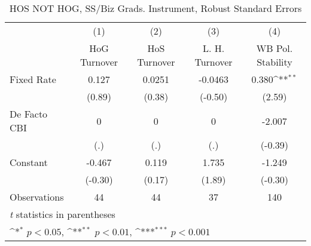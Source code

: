 \begin{table}[htbp]\centering
\def\sym#1{\ifmmode^{#1}\else\(^{#1}\)\fi}
\caption{HOS NOT HOG, SS/Biz Grads. Instrument, Robust Standard Errors \label{NOhoshogIfivs4}}
\begin{tabular}{l*{4}{c}}
\toprule
                                        &\multicolumn{1}{c}{(1)}&\multicolumn{1}{c}{(2)}&\multicolumn{1}{c}{(3)}&\multicolumn{1}{c}{(4)}\\
                                        &\multicolumn{1}{c}{HoG Turnover}&\multicolumn{1}{c}{HoS Turnover}&\multicolumn{1}{c}{L. H. Turnover}&\multicolumn{1}{c}{WB Pol. Stability}\\
\midrule
Fixed Rate                              &    0.127         &   0.0251         &  -0.0463         &    0.380\sym{**} \\
                                        &   (0.89)         &   (0.38)         &  (-0.50)         &   (2.59)         \\
\addlinespace
De Facto CBI                            &        0         &        0         &        0         &   -2.007         \\
                                        &      (.)         &      (.)         &      (.)         &  (-0.39)         \\
\addlinespace
Constant                                &   -0.467         &    0.119         &    1.735         &   -1.249         \\
                                        &  (-0.30)         &   (0.17)         &   (1.89)         &  (-0.30)         \\
\midrule
Observations                            &       44         &       44         &       37         &      140         \\
\bottomrule
\multicolumn{5}{l}{\footnotesize \textit{t} statistics in parentheses}\\
\multicolumn{5}{l}{\footnotesize \sym{*} \(p<0.05\), \sym{**} \(p<0.01\), \sym{***} \(p<0.001\)}\\
\end{tabular}
\end{table}
